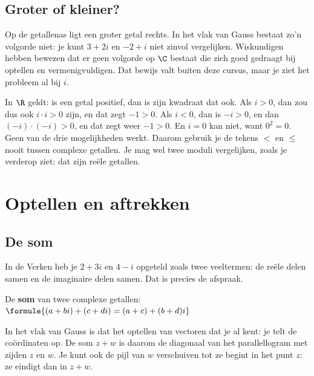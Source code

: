 \begin{oefeningen}
\end{oefeningen}

\subsection{Groter of kleiner?}

Op de getallenas ligt een groter getal rechts. In het vlak van Gauss bestaat zo'n volgorde niet: je kunt $3 + 2i$ en $-2 + i$ niet zinvol vergelijken. Wiskundigen hebben bewezen dat er geen volgorde op $\C$ bestaat die zich goed gedraagt bij optellen en vermenigvuldigen. Dat bewijs valt buiten deze cursus, maar je ziet het probleem al bij $i$.

In $\R$ geldt: is een getal positief, dan is zijn kwadraat dat ook. Als $i > 0$, dan zou dus ook $i \cdot i > 0$ zijn, en dat zegt $-1 > 0$. Als $i < 0$, dan is $-i > 0$, en dan $(-i) \cdot (-i) > 0$, en dat zegt weer $-1 > 0$. En $i = 0$ kan niet, want $0^2 = 0$. Geen van de drie mogelijkheden werkt. Daarom gebruik je de tekens $<$ en $\leqslant$ nooit tussen complexe getallen. Je mag wel twee moduli vergelijken, zoals je verderop ziet: dat zijn reële getallen.

\section{Optellen en aftrekken}

\subsection{De som}

In de Verken heb je $2 + 3i$ en $4 - i$ opgeteld zoals twee veeltermen: de reële delen samen en de imaginaire delen samen. Dat is precies de afspraak.

\begin{theorie}
De \textbf{\textcolor{accent}{som}} van twee complexe getallen: \quad $\formule{(a + bi) + (c + di) = (a + c) + (b + d)i}$
\end{theorie}

In het vlak van Gauss is dat het optellen van vectoren dat je al kent: je telt de coördinaten op. De som $z + w$ is daarom de diagonaal van het parallellogram met zijden $z$ en $w$. Je kunt ook de pijl van $w$ verschuiven tot ze begint in het punt $z$: ze eindigt dan in $z + w$.

